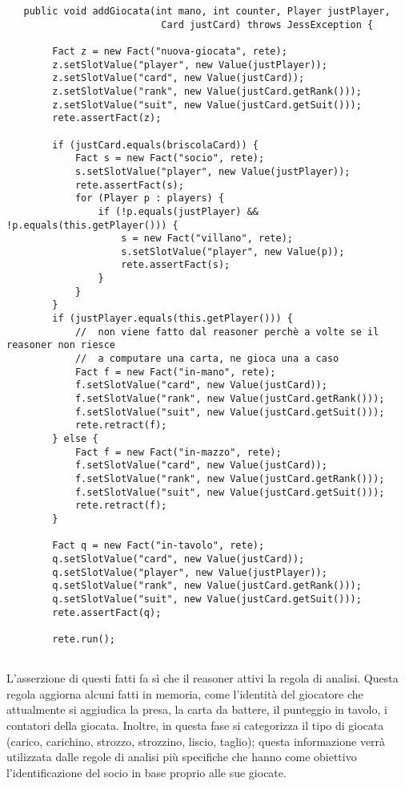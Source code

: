\documentclass[runningheads,a4paper]{llncs}
\begin{document}
\begin{verbatim}
   public void addGiocata(int mano, int counter, Player justPlayer,
                           Card justCard) throws JessException {

        Fact z = new Fact("nuova-giocata", rete);
        z.setSlotValue("player", new Value(justPlayer));
        z.setSlotValue("card", new Value(justCard));
        z.setSlotValue("rank", new Value(justCard.getRank()));
        z.setSlotValue("suit", new Value(justCard.getSuit()));
        rete.assertFact(z);

        if (justCard.equals(briscolaCard)) {
            Fact s = new Fact("socio", rete);
            s.setSlotValue("player", new Value(justPlayer));
            rete.assertFact(s);
            for (Player p : players) {
                if (!p.equals(justPlayer) && !p.equals(this.getPlayer())) {
                    s = new Fact("villano", rete);
                    s.setSlotValue("player", new Value(p));
                    rete.assertFact(s);
                }
            }
        }
        if (justPlayer.equals(this.getPlayer())) {
            //  non viene fatto dal reasoner perchè a volte se il reasoner non riesce
            //  a computare una carta, ne gioca una a caso
            Fact f = new Fact("in-mano", rete);
            f.setSlotValue("card", new Value(justCard));
            f.setSlotValue("rank", new Value(justCard.getRank()));
            f.setSlotValue("suit", new Value(justCard.getSuit()));
            rete.retract(f);
        } else {
            Fact f = new Fact("in-mazzo", rete);
            f.setSlotValue("card", new Value(justCard));
            f.setSlotValue("rank", new Value(justCard.getRank()));
            f.setSlotValue("suit", new Value(justCard.getSuit()));
            rete.retract(f);
        }

        Fact q = new Fact("in-tavolo", rete);
        q.setSlotValue("card", new Value(justCard));
        q.setSlotValue("player", new Value(justPlayer));
        q.setSlotValue("rank", new Value(justCard.getRank()));
        q.setSlotValue("suit", new Value(justCard.getSuit()));
        rete.assertFact(q);

        rete.run();
        
\end{verbatim}


L'asserzione di questi fatti fa sì che il reasoner attivi la regola di analisi.
Questa regola aggiorna alcuni fatti in memoria, come l'identità del giocatore che attualmente si aggiudica la presa, la carta da battere, il punteggio in tavolo, i contatori della giocata.
Inoltre, in questa fase si categorizza il tipo di giocata (carico, carichino, strozzo, strozzino, liscio, taglio); questa informazione verrà utilizzata dalle regole di analisi più specifiche che hanno come obiettivo l'identificazione del socio in base proprio alle sue giocate.
\end{document}
